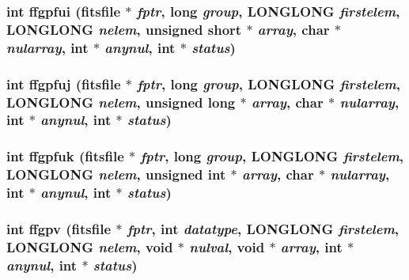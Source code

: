 \subsubsection{\setlength{\rightskip}{0pt plus 5cm}int ffgpfui (\bf{fitsfile} $\ast$ {\em fptr}, long {\em group}, \bf{LONGLONG} {\em firstelem}, \bf{LONGLONG} {\em nelem}, unsigned short $\ast$ {\em array}, char $\ast$ {\em nularray}, int $\ast$ {\em anynul}, int $\ast$ {\em status})}\label{fitsio__64_8h_37540a1aeebbe1a4d6a20df96204a615}


\subsubsection{\setlength{\rightskip}{0pt plus 5cm}int ffgpfuj (\bf{fitsfile} $\ast$ {\em fptr}, long {\em group}, \bf{LONGLONG} {\em firstelem}, \bf{LONGLONG} {\em nelem}, unsigned long $\ast$ {\em array}, char $\ast$ {\em nularray}, int $\ast$ {\em anynul}, int $\ast$ {\em status})}\label{fitsio__64_8h_45489521b50ea72a1b13a57a1bdc6180}


\subsubsection{\setlength{\rightskip}{0pt plus 5cm}int ffgpfuk (\bf{fitsfile} $\ast$ {\em fptr}, long {\em group}, \bf{LONGLONG} {\em firstelem}, \bf{LONGLONG} {\em nelem}, unsigned int $\ast$ {\em array}, char $\ast$ {\em nularray}, int $\ast$ {\em anynul}, int $\ast$ {\em status})}\label{fitsio__64_8h_e184edd1d62907a447c3bce7618b8c57}


\subsubsection{\setlength{\rightskip}{0pt plus 5cm}int ffgpv (\bf{fitsfile} $\ast$ {\em fptr}, int {\em datatype}, \bf{LONGLONG} {\em firstelem}, \bf{LONGLONG} {\em nelem}, void $\ast$ {\em nulval}, void $\ast$ {\em array}, int $\ast$ {\em anynul}, int $\ast$ {\em status})}\label{fitsio__64_8h_0c3f5323e0fb6305fff345b94fb767e7}


